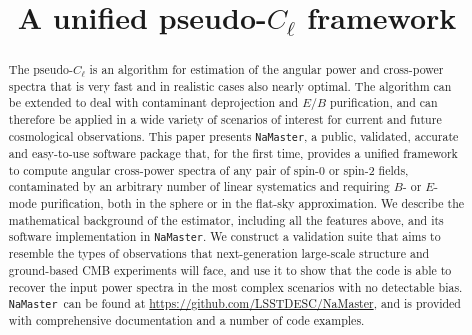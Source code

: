 \documentclass[usenatbib]{mnrasb}
\newcommand{\nmt}{{\tt NaMaster}}
\begin{document}
\title{A unified pseudo-$C_\ell$ framework}

\maketitlepre

\begin{abstract}
  The pseudo-$C_\ell$ is an algorithm for estimation of the angular power and cross-power spectra that is very fast and in realistic cases also nearly optimal. The algorithm can be extended to deal with contaminant deprojection and $E/B$ purification, and can therefore be applied in a wide variety of scenarios of interest for current and future cosmological observations. This paper presents \nmt, a public, validated, accurate and easy-to-use software package that, for the first time, provides a unified framework to compute angular cross-power spectra of any pair of spin-0 or spin-2 fields, contaminated by an arbitrary number of linear systematics and requiring $B$- or $E$-mode purification, both in the sphere or in the flat-sky approximation. We describe the mathematical background of the estimator, including all the features above, and its software implementation in \nmt. We construct a validation suite that aims to resemble the types of observations that next-generation large-scale structure and ground-based CMB experiments will face, and use it to show that the code is able to recover the input power spectra in the most complex scenarios with no detectable bias. \nmt~can be found at \url{https://github.com/LSSTDESC/NaMaster}, and is provided with comprehensive documentation and a number of code examples.
\end{abstract}


\maketitlepost
\end{document}
